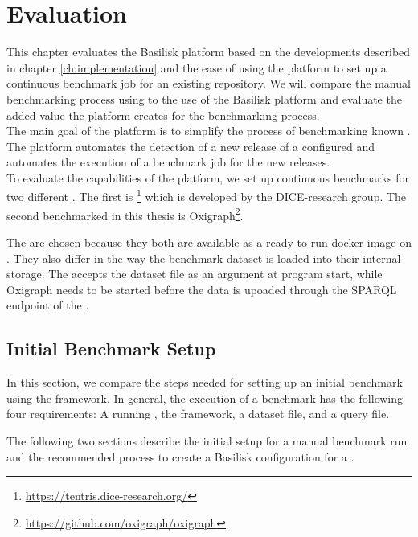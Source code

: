 \chapter{Evaluation}
\label{ch:evaluation}

This chapter evaluates the Basilisk platform based on the developments described in chapter \ref{ch:implementation} and the ease of using the platform to set up a continuous benchmark job for an existing repository.
We will compare the manual benchmarking process using \iguana{} to the use of the Basilisk platform and evaluate the added value the platform creates for the benchmarking process.
\\

The main goal of the platform is to simplify the process of benchmarking known \tsp{}. 
The platform automates the detection of a new release of a configured \ts{} and automates the execution of a benchmark job for the new releases.
\\

To evaluate the capabilities of the platform, we set up continuous benchmarks for two different \tsp{}.
The first \ts{} is \tentris{}\footnote{\url{https://tentris.dice-research.org/}} which is developed by the DICE-research group.
The second \ts{} benchmarked in this thesis is Oxigraph\footnote{\url{https://github.com/oxigraph/oxigraph}}.

The \tsp{} are chosen because they both are available as a ready-to-run docker image on \dockh{}.
They also differ in the way the benchmark dataset is loaded into their internal storage.
The \tentris{} \ts{} accepts the dataset file as an argument at program start, while Oxigraph needs to be started before the data is upoaded through the SPARQL endpoint of the \ts{}.


\section{Initial Benchmark Setup}
In this section, we compare the steps needed for setting up an initial \ts{} benchmark using the \iguana{} framework.
In general, the execution of a benchmark has the following four requirements:
A running \ts{}, the \iguana{} framework, a dataset file, and a query file.

The following two sections describe the initial setup for a manual benchmark run and the recommended process to create a Basilisk configuration for a \ts{}.


